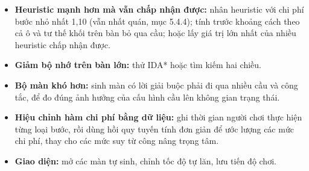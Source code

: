 \begin{itemize}
\tightlist
\item
  \textbf{Heuristic mạnh hơn mà vẫn chấp nhận được:} nhân heuristic với chi phí bước nhỏ nhất 1,10 (vẫn nhất quán, mục 5.4.4); tính trước khoảng cách theo cả ô và tư thế khối trên bàn bỏ qua cầu; hoặc lấy giá trị lớn nhất của nhiều heuristic chấp nhận được.
\item
  \textbf{Giảm bộ nhớ trên bàn lớn:} thử IDA* hoặc tìm kiếm hai chiều.
\item
  \textbf{Bộ màn khó hơn:} sinh màn có lời giải buộc phải đi qua nhiều cầu và công tắc, để đo đúng ảnh hưởng của cấu hình cầu lên không gian trạng thái.
\item
  \textbf{Hiệu chỉnh hàm chi phí bằng dữ liệu:} ghi thời gian người chơi thực hiện từng loại bước, rồi dùng hồi quy tuyến tính đơn giản để ước lượng các mức chi phí, thay cho các mức suy từ công nâng trọng tâm.
\item
  \textbf{Giao diện:} mở các màn tự sinh, chỉnh tốc độ tự lăn, lưu tiến độ chơi.
\end{itemize}
